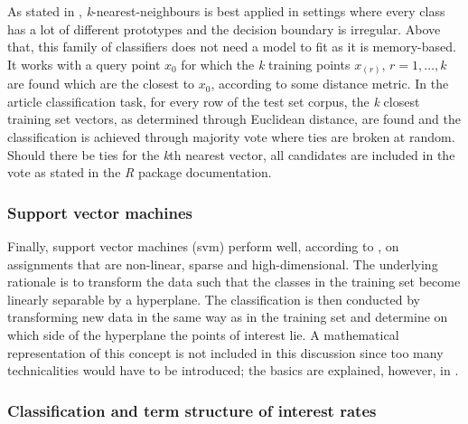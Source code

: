 As stated in \textcite[p.~465]{Friedman.2001}, \textit{k}-nearest-neighbours is best applied in settings where every class has a lot of different prototypes and the decision boundary is irregular. Above that, this family of classifiers does not need a model to fit as it is memory-based. It works with a query point $x_0$ for which the \textit{k} training points $x_{(r)},\, r=1,\dots,k$ are found which are the closest to $x_0$, according to some distance metric. In the article classification task, for every row of the test set corpus, the \textit{k} closest training set vectors, as determined through Euclidean distance, are found and the classification is achieved through majority vote where ties are broken at random. Should there be ties for the \textit{k}th nearest vector, all candidates are included in the vote as stated in the \textit{R} package documentation. 


\subsubsection{Support vector machines} %

Finally, support vector machines (svm) perform well, according to \textcite[p.~293]{Williams.2011}, on assignments that are non-linear, sparse and high-dimensional. The underlying rationale is to transform the data such that the classes in the training set become linearly separable by a hyperplane. The classification is then conducted by transforming new data in the same way as in the training set and determine on which side of the hyperplane the points of interest lie. A mathematical representation of this concept is not included in this discussion since too many technicalities would have to be introduced; the basics are explained, however, in \textcite[p.~417]{Friedman.2001}. 

%
\subsubsection{Classification and term structure of interest rates}

